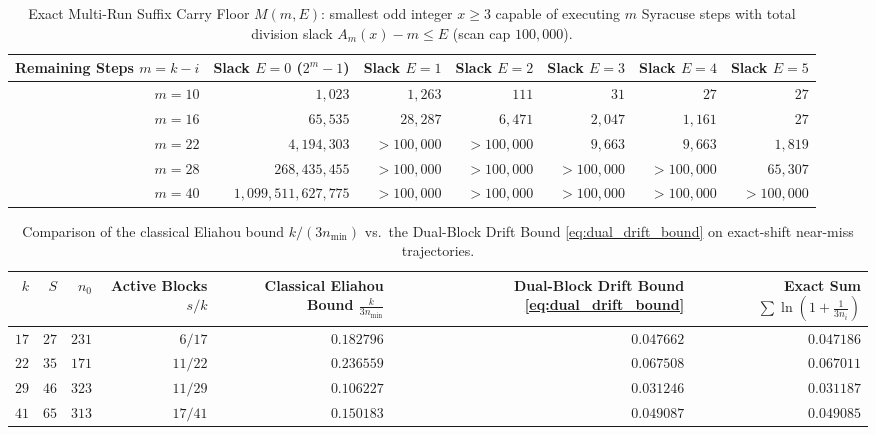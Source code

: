 \documentclass[11pt, a4paper]{amsart}
\theoremstyle{definition}
\begin{document}
\begin{table}[htbp]
\centering
\caption{Exact Multi-Run Suffix Carry Floor $M(m, E)$: smallest odd integer $x \ge 3$ capable of executing $m$ Syracuse steps with total division slack $A_m(x) - m \le E$ (scan cap $100,000$).}
\label{tab:carry_floor}
\footnotesize
\begin{tabular}{@{}rrrrrrr@{}}
\toprule
Remaining Steps $m = k - i$ & Slack $E=0$ ($2^m - 1$) & Slack $E=1$ & Slack $E=2$ & Slack $E=3$ & Slack $E=4$ & Slack $E=5$ \\
\midrule
$m = 10$ & $1,023$             & $1,263$    & $111$      & $31$       & $27$       & $27$ \\
$m = 16$ & $65,535$            & $28,287$   & $6,471$    & $2,047$    & $1,161$    & $27$ \\
$m = 22$ & $4,194,303$         & $>100,000$ & $>100,000$ & $9,663$    & $9,663$    & $1,819$ \\
$m = 28$ & $268,435,455$       & $>100,000$ & $>100,000$ & $>100,000$ & $>100,000$ & $65,307$ \\
$m = 40$ & $1,099,511,627,775$ & $>100,000$ & $>100,000$ & $>100,000$ & $>100,000$ & $>100,000$ \\
\bottomrule
\end{tabular}
\end{table}

\begin{table}[htbp]
\centering
\caption{Comparison of the classical Eliahou bound $k/(3n_{\min})$ vs.\ the Dual-Block Drift Bound \eqref{eq:dual_drift_bound} on exact-shift near-miss trajectories.}
\label{tab:dual_block}
\footnotesize
\begin{tabular}{@{}rrrrrrr@{}}
\toprule
$k$ & $S$ & $n_0$ & Active Blocks $s / k$ & Classical Eliahou Bound $\frac{k}{3n_{\min}}$ & Dual-Block Drift Bound \eqref{eq:dual_drift_bound} & Exact Sum $\sum \ln(1 + \frac{1}{3n_i})$ \\
\midrule
$17$ & $27$ & $231$ & $6 / 17$  & $0.182796$ & $\mathbf{0.047662}$ & $0.047186$ \\
$22$ & $35$ & $171$ & $11 / 22$ & $0.236559$ & $\mathbf{0.067508}$ & $0.067011$ \\
$29$ & $46$ & $323$ & $11 / 29$ & $0.106227$ & $\mathbf{0.031246}$ & $0.031187$ \\
$41$ & $65$ & $313$ & $17 / 41$ & $0.150183$ & $\mathbf{0.049087}$ & $0.049085$ \\
\bottomrule
\end{tabular}
\end{table}
\end{document}
